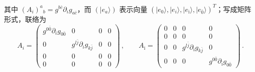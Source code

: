 其中 $(A_i)^a{}_b=g^{b\bar c}\partial_i g_{a\bar c}$，而 $(|e_a\rangle)$ 表示向量
$(|e_0\rangle,|e_i\rangle,|e_{\bar\imath}\rangle,|e_{\bar 0}\rangle)^T$；写成矩阵形式，联络为
\begin{equation}
  A_i=
  \begin{pmatrix}
    g^{0\bar 0}\partial_i g_{0\bar 0} & 0 & 0 & 0\\
    0 & g^{l\bar j}\partial_i g_{k\bar j} & 0 & 0\\
    0 & 0 & 0 & 0\\
    0 & 0 & 0 & 0
  \end{pmatrix}\,,\qquad
  A_{\bar\imath}=
  \begin{pmatrix}
    0 & 0 & 0 & 0\\
    0 & 0 & 0 & 0\\
    0 & 0 & g^{l\bar j}\partial_{\bar\imath} g_{k\bar j} & 0\\
    0 & 0 & 0 & g^{0\bar 0}\partial_{\bar\imath} g_{0\bar 0}
  \end{pmatrix}\,.
  \tag{4.4}
  \label{eq:4.4}
\end{equation}

